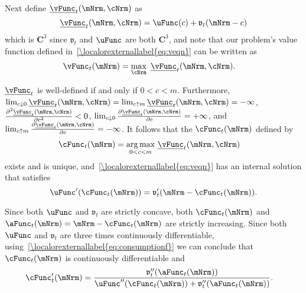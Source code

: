 \documentclass[\econtexRoot/BufferStockTheory]{subfiles}
\begin{document}
Next define $\underline{\vFunc}_{t}(\mNrm,\cNrm)$ as
\begin{equation}
  \underline{\vFunc}_{t}(\mNrm,\cNrm)=\uFunc(c)+\mathfrak{v}_{t}(\mNrm-c)
\end{equation}
which is $\mathbf{C}^{3}$ since $\mathfrak{v}_{t}$ and $\uFunc$ are both
$\mathbf{C}^{3}$, and note that our problem's value function defined
in~\eqref{\localorexternallabel{eq:veqn}} can be written as
\begin{equation}\begin{gathered}\begin{aligned}
      \vFunc_{t}(\mNrm)  & =  \max_{\cNrm}~\underline{\vFunc}_{t}(\mNrm,\cNrm).
    \end{aligned}\end{gathered}\end{equation}

$\underline{\vFunc}_{t}$ is well-defined if and only if $0<c<m$.  Furthermore,
$\lim_{c \downarrow
  0}\underline{\vFunc}_{t}(\mNrm,\cNrm)=\lim_{c\uparrow m} \underline{\vFunc}_{t}(\mNrm,\cNrm)=-\infty $, $\frac{\partial ^{2}\underline{\vFunc}_{t}(\mNrm,\cNrm)}{\partial c^{2}}%
<0$, $\lim_{c \downarrow 0}\frac{\partial \underline{\vFunc}_{t}(\mNrm,\cNrm)}{\partial c}%
=+\infty $, and $\lim_{c\uparrow m} \frac{\partial \underline{\vFunc}_{t}(\mNrm,\cNrm)}{%
  \partial c}=-\infty $. It follows that the $\cFunc_{t}(\mNrm)$ defined by
\begin{equation}\begin{gathered}\begin{aligned}
      \cFunc_{t}(\mNrm)  & = \underset{0<c<m}{\arg \max }~\underline{\vFunc}_{t}(\mNrm,\cNrm)
    \end{aligned}\end{gathered}\end{equation}
exists and is unique, and~\eqref{\localorexternallabel{eq:veqn}} has an internal
solution that satisfies
\begin{equation}
  \uFunc^{\prime }(\cFunc_{t}(\mNrm))=\mathfrak{v}_{t}^{\prime }(\mNrm-\cFunc_{t}(\mNrm))  \label{eq:consumptionf}.
\end{equation}


Since both $\uFunc$ and $\mathfrak{v}_{t}$ are strictly concave, both
$\cFunc_{t}(\mNrm)$ and $\aFunc_{t}(\mNrm)=\mNrm-\cFunc_{t}(\mNrm)$
are strictly increasing. Since both $\uFunc$ and $\mathfrak{v}_{t}$ are
three times continuously differentiable, using~\eqref{\localorexternallabel{eq:consumptionf}} we can conclude that
$\cFunc_{t}(\mNrm)$ is continuously differentiable and
\begin{equation}\begin{gathered}\begin{aligned}
      \cFunc_{t}^{\prime }(\mNrm)  & = \frac{\mathfrak{v}_{t}^{\prime \prime }({\aFunc}_{t}(\mNrm))  }{\uFunc^{\prime \prime }(\cFunc_{t}(\mNrm))+\mathfrak{v}_{t}^{\prime \prime }({\aFunc}_{t}(\mNrm))}.
    \end{aligned}\end{gathered}\end{equation}
\end{document}
